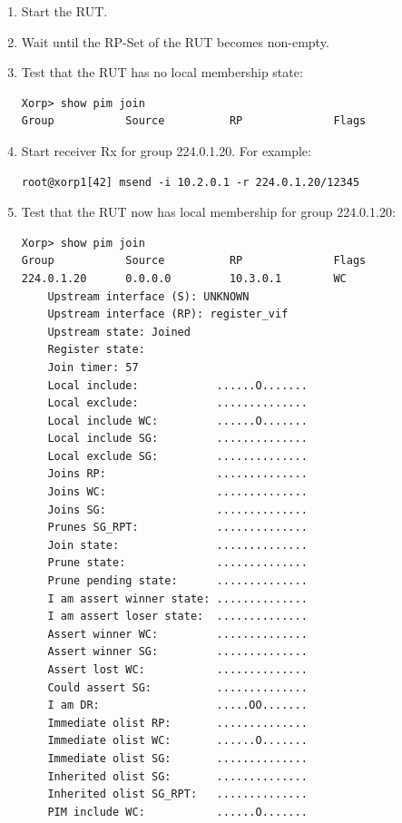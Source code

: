 \documentclass[11pt]{report}
\begin{document}


\begin{enumerate}

  \item Start the RUT.

  \item Wait until the RP-Set of the RUT becomes non-empty.

  \item Test that the RUT has no local membership state:

\begin{verbatim}
Xorp> show pim join
Group           Source          RP              Flags
\end{verbatim}

  \item Start receiver Rx for group 224.0.1.20. For example:

\begin{verbatim}
root@xorp1[42] msend -i 10.2.0.1 -r 224.0.1.20/12345
\end{verbatim}

  \item Test that the RUT now has local membership for group 224.0.1.20:

\begin{verbatim}
Xorp> show pim join
Group           Source          RP              Flags
224.0.1.20      0.0.0.0         10.3.0.1        WC
    Upstream interface (S): UNKNOWN
    Upstream interface (RP): register_vif
    Upstream state: Joined
    Register state:
    Join timer: 57
    Local include:            ......O.......
    Local exclude:            ..............
    Local include WC:         ......O.......
    Local include SG:         ..............
    Local exclude SG:         ..............
    Joins RP:                 ..............
    Joins WC:                 ..............
    Joins SG:                 ..............
    Prunes SG_RPT:            ..............
    Join state:               ..............
    Prune state:              ..............
    Prune pending state:      ..............
    I am assert winner state: ..............
    I am assert loser state:  ..............
    Assert winner WC:         ..............
    Assert winner SG:         ..............
    Assert lost WC:           ..............
    Could assert SG:          ..............
    I am DR:                  .....OO.......
    Immediate olist RP:       ..............
    Immediate olist WC:       ......O.......
    Immediate olist SG:       ..............
    Inherited olist SG:       ..............
    Inherited olist SG_RPT:   ..............
    PIM include WC:           ......O.......
\end{verbatim}


\end{enumerate}
\end{document}

